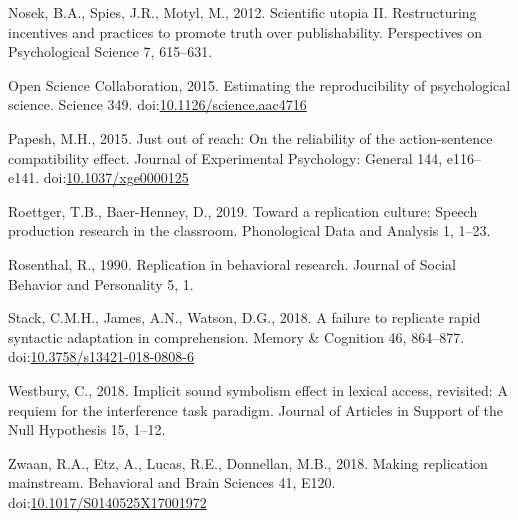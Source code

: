 \documentclass[]{elsarticle} %
\newlength{\cslhangindent}
\newenvironment{CSLReferences}[2] %
 {%
  \setlength{\parindent}{0pt}
  \ifodd #1 \everypar{\setlength{\hangindent}{\cslhangindent}}\ignorespaces\fi
  \ifnum #2 > 0
  \setlength{\parskip}{#2\baselineskip}
  \fi
 }%
 {}
\begin{document}
\begin{CSLReferences}{1}{0}
\leavevmode{}%
Nosek, B.A., Spies, J.R., Motyl, M., 2012. Scientific utopia {II}.
{Restructuring} incentives and practices to promote truth over
publishability. Perspectives on Psychological Science 7, 615--631.

\leavevmode{}%
Open Science Collaboration, 2015. Estimating the reproducibility of
psychological science. Science 349.
doi:\href{https://doi.org/10.1126/science.aac4716}{10.1126/science.aac4716}

\leavevmode{}%
Papesh, M.H., 2015. Just out of reach: {On} the reliability of the
action-sentence compatibility effect. Journal of Experimental
Psychology: General 144, e116--e141.
doi:\href{https://doi.org/10.1037/xge0000125}{10.1037/xge0000125}

\leavevmode{}%
Roettger, T.B., Baer-Henney, D., 2019. Toward a replication culture:
{Speech} production research in the classroom. Phonological Data and
Analysis 1, 1--23.

\leavevmode{}%
Rosenthal, R., 1990. Replication in behavioral research. Journal of
Social Behavior and Personality 5, 1.

\leavevmode{}%
Stack, C.M.H., James, A.N., Watson, D.G., 2018. A failure to replicate
rapid syntactic adaptation in comprehension. Memory \& Cognition 46,
864--877.
doi:\href{https://doi.org/10.3758/s13421-018-0808-6}{10.3758/s13421-018-0808-6}

\leavevmode{}%
Westbury, C., 2018. Implicit sound symbolism effect in lexical access,
revisited: {A} requiem for the interference task paradigm. Journal of
Articles in Support of the Null Hypothesis 15, 1--12.

\leavevmode{}%
Zwaan, R.A., Etz, A., Lucas, R.E., Donnellan, M.B., 2018. Making
replication mainstream. Behavioral and Brain Sciences 41, E120.
doi:\href{https://doi.org/10.1017/S0140525X17001972}{10.1017/S0140525X17001972}

\end{CSLReferences}
\end{document}
